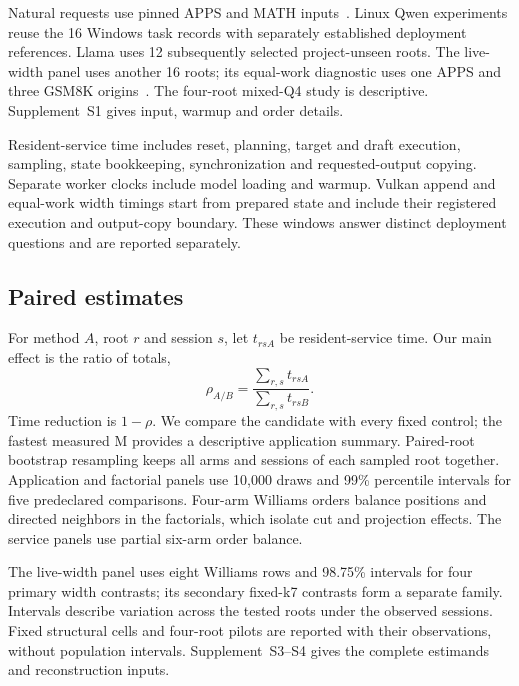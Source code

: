 Natural requests use pinned APPS and MATH inputs~\cite{apps,math}. Linux Qwen experiments reuse the 16 Windows task records with separately established deployment references. Llama uses 12 subsequently selected project-unseen roots. The live-width panel uses another 16 roots; its equal-work diagnostic uses one APPS and three GSM8K origins~\cite{gsm8k}. The four-root mixed-Q4 study is descriptive. Supplement~S1 gives input, warmup and order details.

Resident-service time includes reset, planning, target and draft execution, sampling, state bookkeeping, synchronization and requested-output copying. Separate worker clocks include model loading and warmup. Vulkan append and equal-work width timings start from prepared state and include their registered execution and output-copy boundary. These windows answer distinct deployment questions and are reported separately.

\subsection{Paired estimates}
For method $A$, root $r$ and session $s$, let $t_{rsA}$ be resident-service time. Our main effect is the ratio of totals,
\begin{equation}
 \rho_{A/B}=\frac{\sum_{r,s}t_{rsA}}{\sum_{r,s}t_{rsB}}.
 \label{eq:ratio}
\end{equation}
Time reduction is $1-\rho$. We compare the candidate with every fixed control; the fastest measured M provides a descriptive application summary. Paired-root bootstrap resampling keeps all arms and sessions of each sampled root together. Application and factorial panels use 10,000 draws and 99\% percentile intervals for five predeclared comparisons. Four-arm Williams orders balance positions and directed neighbors in the factorials, which isolate cut and projection effects. The service panels use partial six-arm order balance.

The live-width panel uses eight Williams rows and 98.75\% intervals for four primary width contrasts; its secondary fixed-k7 contrasts form a separate family. Intervals describe variation across the tested roots under the observed sessions. Fixed structural cells and four-root pilots are reported with their observations, without population intervals. Supplement~S3--S4 gives the complete estimands and reconstruction inputs.

